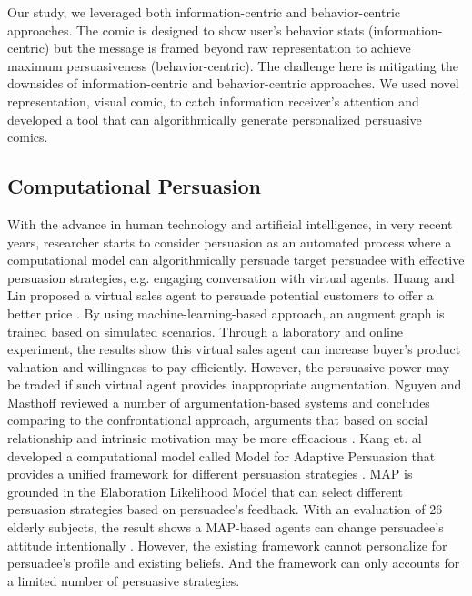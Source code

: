 Our study, we leveraged both information-centric and behavior-centric approaches. The comic is designed to show user's behavior stats (information-centric) but the message is framed beyond raw representation to achieve maximum persuasiveness (behavior-centric). The challenge here is mitigating the downsides of information-centric and behavior-centric approaches. We used novel representation, visual comic, to catch information receiver's attention and developed a tool that can algorithmically generate personalized persuasive comics.\par


\subsection{Computational Persuasion}
With the advance in human technology and artificial intelligence, in very recent years, researcher starts to consider persuasion as an automated process where a computational model can algorithmically persuade target persuadee with effective persuasion strategies, e.g. engaging conversation with virtual agents\cite{huang2007design,nguyen2008designing,KangT15}. Huang and Lin proposed a virtual sales agent to persuade potential customers to offer a better price \cite{huang2007design}. By using machine-learning-based approach, an augment graph is trained based on simulated scenarios. Through a laboratory and online experiment, the results show this virtual sales agent can increase buyer's product valuation and willingness-to-pay efficiently. However, the persuasive power may be traded if such virtual agent provides inappropriate augmentation. Nguyen and Masthoff reviewed a number of argumentation-based systems and concludes comparing to the confrontational approach, arguments that based on social relationship and intrinsic motivation may be more efficacious \cite{nguyen2008designing}. Kang et. al developed a computational model called Model for Adaptive Persuasion that provides a unified framework for different persuasion strategies \cite{KangT15}. MAP is grounded in the Elaboration Likelihood Model that can select different persuasion strategies based on persuadee's feedback. With an evaluation of 26 elderly subjects, the result shows a MAP-based agents can change persuadee's attitude intentionally \cite{KangT15}. However, the existing framework cannot personalize for persuadee's profile and existing beliefs. And the framework can only accounts for a limited number of persuasive strategies.\par
